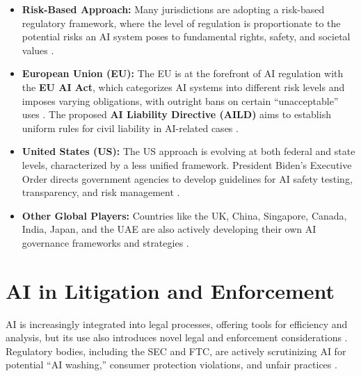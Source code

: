 \begin{itemize}
    \item \textbf{Risk-Based Approach:} Many jurisdictions are adopting a risk-based regulatory framework, where the level of regulation is proportionate to the potential risks an AI system poses to fundamental rights, safety, and societal values \parencite{EY2023}.
    \item \textbf{European Union (EU):} The EU is at the forefront of AI regulation with the \textbf{EU AI Act}, which categorizes AI systems into different risk levels and imposes varying obligations, with outright bans on certain ``unacceptable'' uses \parencite{CliffordChance2023}. The proposed \textbf{AI Liability Directive (AILD)} aims to establish uniform rules for civil liability in AI-related cases \parencite{EuropaEU2022}.
    \item \textbf{United States (US):} The US approach is evolving at both federal and state levels, characterized by a less unified framework. President Biden's Executive Order directs government agencies to develop guidelines for AI safety testing, transparency, and risk management \parencite{CliffordChance2023}.
    \item \textbf{Other Global Players:} Countries like the UK, China, Singapore, Canada, India, Japan, and the UAE are also actively developing their own AI governance frameworks and strategies \parencite{GlobalAILaw2023}.
\end{itemize}

\section{AI in Litigation and Enforcement}
\label{sec:ai_in_litigation}
AI is increasingly integrated into legal processes, offering tools for efficiency and analysis, but its use also introduces novel legal and enforcement considerations \parencite{BloombergLaw2023}. Regulatory bodies, including the SEC and FTC, are actively scrutinizing AI for potential ``AI washing,'' consumer protection violations, and unfair practices \parencite{AlvarezMarsal2023}.

